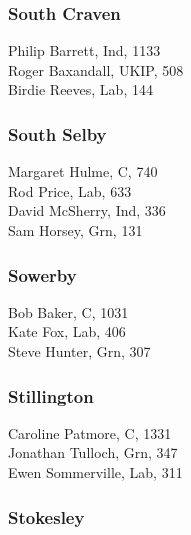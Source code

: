 \documentclass[a4paper,openany,10pt]{book}
\begin{document}
\subsubsection*{South Craven}



Philip Barrett, Ind, 1133\\
Roger Baxandall, UKIP, 508\\
Birdie Reeves, Lab, 144\\


\subsubsection*{South Selby}



Margaret Hulme, C, 740\\
Rod Price, Lab, 633\\
David McSherry, Ind, 336\\
Sam Horsey, Grn, 131\\


\subsubsection*{Sowerby}



Bob Baker, C, 1031\\
Kate Fox, Lab, 406\\
Steve Hunter, Grn, 307\\


\subsubsection*{Stillington}



Caroline Patmore, C, 1331\\
Jonathan Tulloch, Grn, 347\\
Ewen Sommerville, Lab, 311\\


\subsubsection*{Stokesley}
\end{document}
